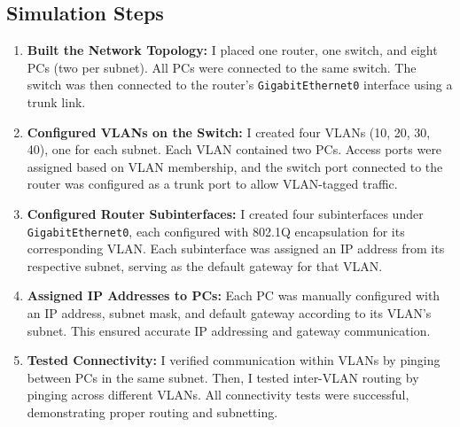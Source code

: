 \documentclass[11pt,a4paper]{article}
\let\oldincludegraphics\includegraphics
\renewcommand{\includegraphics}[2][]{%
  \begin{center}
    \oldincludegraphics[#1]{#2}
  \end{center}
}
\begin{document}
\subsection{Simulation Steps}
\begin{enumerate}

\item \textbf{Built the Network Topology:} I placed one router, one switch, and eight PCs (two per subnet). All PCs were connected to the same switch. The switch was then connected to the router's \texttt{GigabitEthernet0} interface using a trunk link.


\item \textbf{Configured VLANs on the Switch:} I created four VLANs (10, 20, 30, 40), one for each subnet. Each VLAN contained two PCs. Access ports were assigned based on VLAN membership, and the switch port connected to the router was configured as a trunk port to allow VLAN-tagged traffic.


\item \textbf{Configured Router Subinterfaces:} I created four subinterfaces under \texttt{GigabitEthernet0}, each configured with 802.1Q encapsulation for its corresponding VLAN. Each subinterface was assigned an IP address from its respective subnet, serving as the default gateway for that VLAN.


\item \textbf{Assigned IP Addresses to PCs:} Each PC was manually configured with an IP address, subnet mask, and default gateway according to its VLAN’s subnet. This ensured accurate IP addressing and gateway communication.


\item \textbf{Tested Connectivity:} I verified communication within VLANs by pinging between PCs in the same subnet. Then, I tested inter-VLAN routing by pinging across different VLANs. All connectivity tests were successful, demonstrating proper routing and subnetting.

 \\[1em]
\end{enumerate}
\end{document}
